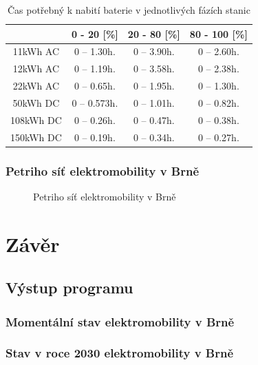 \documentclass[a4paper,11pt]{article}
\begin{document}
\begin{table}[h!]
    \centering 
    \vspace{0.5cm} %
    \begin{tabular}{|c|c|c|c|}
        \hline
        \textbf{} & \textbf{0 - 20 [\%]} & \textbf{20 - 80 [\%]} & \textbf{80 - 100 [\%]}\\
        \hline
        11kWh AC  &  0 -- 1.30h.  & 0 -- 3.90h. & 0 -- 2.60h.  \\
        \hline
        12kWh AC  &  0 -- 1.19h.  & 0 -- 3.58h. & 0 -- 2.38h.  \\
        \hline
        22kWh AC  &  0 -- 0.65h.  & 0 -- 1.95h. & 0 -- 1.30h.  \\
        \hline
        50kWh DC  &  0 -- 0.573h. & 0 -- 1.01h. & 0 -- 0.82h.  \\
        \hline
        108kWh DC &  0 -- 0.26h.  & 0 -- 0.47h. & 0 -- 0.38h.  \\
        \hline
        150kWh DC &  0 -- 0.19h.  & 0 -- 0.34h. & 0 -- 0.27h.  \\
        \hline
    \end{tabular}
    \caption{Čas potřebný k nabití baterie v jednotlivých fázích stanic}
    \label{table:charging-time-consumption}
    \vspace{0.5cm} %
\end{table}


\subsubsection{Petriho síť elektromobility v Brně}

\begin{figure}[H]
    \centering
    \caption{Petriho síť elektromobility v Brně}
    \label{figure:ims-petri-net}
\end{figure}

\section{Závěr}

\subsection{Výstup programu}

\subsubsection{Momentální stav elektromobility v Brně}

\subsubsection{Stav v roce 2030 elektromobility v Brně}

\newpage

      
\end{document}
